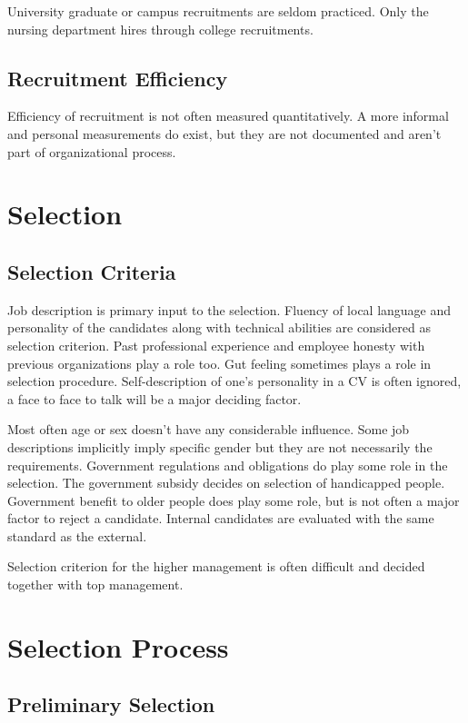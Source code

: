 \documentclass[a4paper,fleqn,11pt,dvips,titlepage]{article}
\numberwithin{figure}{section}
\numberwithin{equation}{section}
\begin{document}
University graduate or campus recruitments are seldom practiced.
Only the nursing department hires through college recruitments.


\subsection{Recruitment Efficiency}

Efficiency of recruitment is not often measured quantitatively.
A more informal and personal measurements do exist, but they are not documented and aren’t part of organizational process.

\section{Selection}
 
\subsection{Selection Criteria}

Job description is primary input to the selection.
Fluency of local language and personality of the candidates along with technical abilities are considered as selection criterion.
Past professional experience and employee honesty with previous organizations play a role too.
Gut feeling sometimes plays a role in selection procedure.
Self-description of one’s personality in a CV is often ignored, a face to face to talk will be a major deciding factor. 

Most often age or sex doesn’t have any considerable influence.
Some job descriptions implicitly imply specific gender but they are not necessarily the requirements.
Government regulations and obligations do play some role in the selection.
The government subsidy decides on selection of handicapped people.
Government benefit to older people does play some role, but is not often a major factor to reject a candidate.
Internal candidates are evaluated with the same standard as the external.

Selection criterion for the higher management is often difficult and decided together with top management.


\section{Selection Process}

\subsection{Preliminary Selection}
\end{document}
